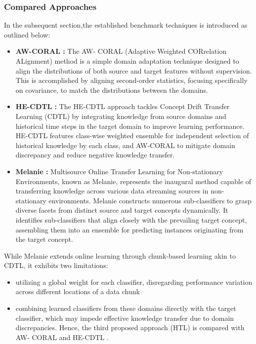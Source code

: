   \subsubsection{Compared Approaches}
  In the subsequent section,the established benchmark techniques is introduced as outlined below:
  \begin{itemize}
    \item \textbf{AW-CORAL \cite{sun2016return}:} The AW- CORAL (Adaptive Weighted CORrelation ALignment) method is a simple domain adaptation technique designed to align the distributions of both source and target features without supervision. This is accomplished by aligning second-order statistics, focusing specifically on covariance, to match the distributions between the domains.
    \item \textbf{HE-CDTL \cite{sun2016return}:} The HE-CDTL approach tackles Concept Drift Transfer Learning (CDTL) by integrating knowledge from source domains and historical time steps in the target domain to improve learning performance. HE-CDTL features class-wise weighted ensemble for independent selection of historical knowledge by each class, and AW-CORAL to mitigate domain discrepancy and reduce negative knowledge transfer.
    \item \textbf{Melanie \cite{dong2019multistream}:} Multisource Online Transfer Learning for Non-stationary Environments, known as Melanie, represents the inaugural method capable of transferring knowledge across various data streaming sources in non-stationary environments. Melanie constructs numerous sub-classifiers to grasp diverse facets from distinct source and target concepts dynamically. It identifies sub-classifiers that align closely with the prevailing target concept, assembling them into an ensemble for predicting instances originating from the target concept.
  \end{itemize}

While Melanie extends online learning through chunk-based learning akin to CDTL, it exhibits two limitations: 
\begin{itemize}
  \item utilizing a global weight for each classifier, disregarding performance variation across different locations of a data chunk
  \item combining learned classifiers from these domains directly with the target classifier, which may impede effective knowledge transfer due to domain discrepancies. Hence, the third proposed approach (HTL) is compared with AW- CORAL \cite{sun2016return} and HE-CDTL \cite{yang2021concept}.
\end{itemize}

